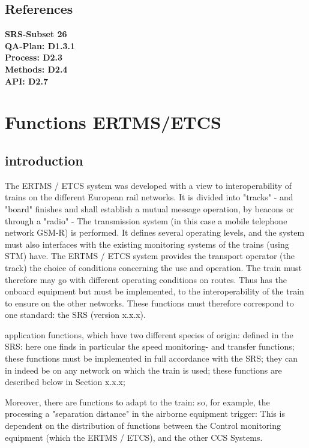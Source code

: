 \documentclass{template/openetcs_article}
\begin{document}
\subsection{References}

\textbf{SRS-Subset 26}\\
\textbf{QA-Plan: D1.3.1}\\
\textbf{Process: D2.3}\\
\textbf{Methods: D2.4}\\
\textbf{API: D2.7}\\

\section{Functions ERTMS/ETCS}

\subsection{introduction}

The ERTMS / ETCS system was developed with a view to interoperability of trains on the 
different European rail networks. It is divided into "tracks" - and "board" finishes 
and shall establish a mutual message operation, by beacons or through a "radio" - 
The transmission system (in this case a mobile telephone network GSM-R) is performed. 
It defines several operating levels, and the system must also interfaces with the 
existing monitoring systems of the trains (using STM) have. 
The ERTMS / ETCS system provides the transport operator (the track) the choice of conditions 
concerning the use and operation. 
The train must therefore may go with different operating conditions on routes. 
Thus has the onboard equipment but must be implemented, 
to the interoperability of the train to ensure on the other networks. 
These functions must therefore correspond to one standard: the SRS (version x.x.x). 

application functions, which have two different species of origin: 
defined in the SRS: here one finds in particular the 
speed monitoring- and transfer functions; these functions 
must be implemented in full accordance with the SRS; they can in 
indeed be on any network on which the train is used; these functions 
are described below in Section x.x.x; 


Moreover, there are functions to adapt to the train: so, for example, the processing 
a "separation distance" in the airborne equipment trigger: 
This is dependent on the distribution of functions between the 
Control monitoring equipment (which the ERTMS / ETCS), and the other 
CCS Systems.
\end{document}
